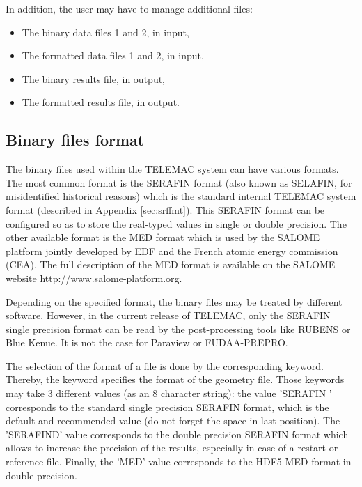 In addition, the user may have to manage additional files:

\begin{itemize}
\item The binary data files 1 and 2, in input,

\item The formatted data files 1 and 2, in input,

\item The binary results file, in output,

\item The formatted results file, in output.
\end{itemize}


\subsection{Binary files format}
\label{sec:binfile}
The binary files used within the TELEMAC system can have various formats. The
most common format is the SERAFIN format (also known as SELAFIN, for
misidentified historical reasons) which is the standard internal TELEMAC system
format (described in Appendix \ref{sec:srffmt}). This SERAFIN format can be
configured so as to store the real-typed values in single or double precision.
The other available format is the MED format which is used by the SALOME
platform jointly developed by EDF and the French atomic energy commission
(CEA).
The full description of the MED format is available on the SALOME website
http://www.salome-platform.org.

Depending on the specified format, the binary files may be treated by different
software. However, in the current release of TELEMAC, only the SERAFIN single
precision format can be read by the post-processing tools like RUBENS
or Blue Kenue.
It is not the case for Paraview or FUDAA-PREPRO.

The selection of the format of a file is done by the corresponding keyword.
Thereby, the keyword  specifies the format of the
geometry file. Those keywords may take 3 different values (as an 8 character
string): the value 'SERAFIN ' corresponds to the standard single precision
SERAFIN format, which is the default and recommended value (do not forget the
space in last position). The 'SERAFIND' value corresponds to the double
precision SERAFIN format which allows to increase the precision of the results,
especially in case of a restart or reference file. Finally, the 'MED' value
corresponds to the HDF5 MED format in double precision.

